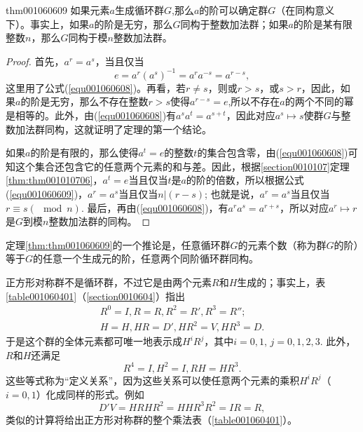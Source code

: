 \begin{theorem}{}{thm001060609}
如果元素$a$生成循环群$G$,那么$a$的阶可以确定群$G$（在同构意义下）。事实上，如果$a$的阶是无穷，那么$G$同构于整数加法群；如果$a$的阶是某有限整数$n$，那么$G$同构于模$n$整数加法群。
\end{theorem}

\begin{proof}
首先，$a^r = a^s$，当且仅当
\begin{equation}\label{equ001060609}
e = a^{r}(a^s)^{-1} = a^ra^{-s} = a^{r-s},
\end{equation}
这里用了公式(\ref{equ001060608})。再看，若$r \neq s$，则或$r > s$，或$s > r$，因此，如果$a$的阶是无穷，那么不存在整数$r > s$使得$a^{r-s} = e$,所以不存在$a$的两个不同的幂是相等的。此外，由(\ref{equ001060608})有$a^sa^t = a^{s+t}$，因此对应$a^s \mapsto s$使群$G$与整数加法群同构，这就证明了定理的第一个结论。

如果$a$的阶是有限的，那么使得$a^t=e$的整数$t$的集合包含零，由(\ref{equ001060608})可知这个集合还包含它的任意两个元素的和与差。因此，根据\ref{section0010107}定理\ref{thm:thm001010706}，$a^t=e$当且仅当$t$是$a$的阶的倍数，所以根据公式(\ref{equ001060609})，$a^r=a^s$当且仅当$n|(r-s)$; 也就是说，$a^r=a^s$当且仅当$r \equiv s(\mod{n})$. 最后，再由(\ref{equ001060608})，有$a^ra^s=a^{r+s}$，所以对应$a^r \mapsto r$是$G$到模$n$整数加法群的同构。
\end{proof}

定理\ref{thm:thm001060609}的一个推论是，任意循环群$G$的元素个数（称为群$G$的阶）等于$G$的任意一个生成元的阶，任意两个同阶循环群同构。

正方形对称群不是循环群，不过它是由两个元素$R$和$H$生成的；事实上，表\ref{table001060401}（\ref{section0010604}）指出
\begin{gather*}
R^0=I, R=R, R^2=R', R^3=R'';\\
H=H, HR=D', HR^2=V, HR^3=D.
\end{gather*}
于是这个群的全体元素都可唯一地表示成$H^iR^j$，其中$i=0,1$, $j=0,1,2,3$. 此外，$R$和$H$还满足
\[
R^4=I, H^2=I, RH=HR^3.
\]
这些等式称为“定义关系”，因为这些关系可以使任意两个元素的乘积$H^iR^j$（$i=0,1$）化成同样的形式。例如
\[
D'V=HRHR^2 = HHR^3R^2=IR=R,
\]
类似的计算将给出正方形对称群的整个乘法表（\ref{table001060401}）。


